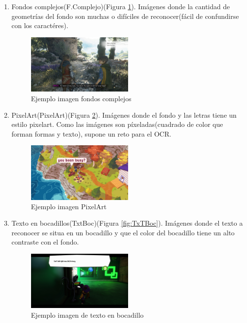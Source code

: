 \begin{enumerate}
	\item Fondos complejos(F.Complejo)(Figura \ref{fig:Fcomplejo}). Imágenes donde la cantidad de geometrías del fondo son muchas o difíciles de reconocer(fácil de confundirse con los caractéres).
	\begin{figure}[H]
		\centering
		\includegraphics[width = 0.5\textwidth]{Imagenes/OCR/Complejo.png}
		\caption{Ejemplo imagen fondos complejos }
		\label{fig:Fcomplejo}
	\end{figure}
	\item PixelArt(PixelArt)(Figura \ref{fig:Pixelart}). Imágenes donde el fondo y las letras tiene un estilo pixelart. Como las imágenes son píxeladas(cuadrado de color que forman formas y texto), supone un reto para el OCR.
	\begin{figure}[H]
		\centering
		\includegraphics[width = 0.5\textwidth]{Imagenes/OCR/Pixel.png}
		\caption{Ejemplo imagen PixelArt }
		\label{fig:Pixelart}
	\end{figure}
	\item Texto en bocadillos(TxtBoc)(Figura \ref{fig:TxTBoc}). Imágenes donde el texto a reconocer se situa en un bocadillo y que el color del bocadillo tiene un alto contraste con el fondo.
	\begin{figure}[H]
		\centering
		\includegraphics[width = 0.5\textwidth]{Imagenes/OCR/Boc.png}
		\caption{Ejemplo imagen de texto en bocadillo }

\end{figure}
\end{enumerate}
